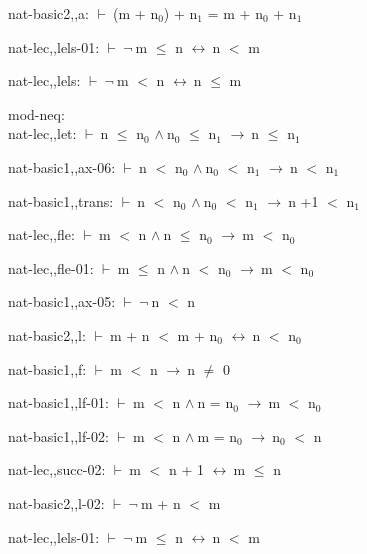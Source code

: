 \documentclass[a4paper]{article}
\newcommand{\Fol}{\mbox{$\vdash\ $}}
\newcommand{\Not}{\mbox{$\neg\ $}}
\newcommand{\And}{\mbox{$\wedge\ $}}
\newcommand{\Imp}{\mbox{$\rightarrow\ $}}
\newcommand{\Equiv}{\mbox{$\leftrightarrow\ $}}
\begin{document}
nat-basic2,,a: 
 \Fol (m + $\mbox{n}_{0}$) + $\mbox{n}_{1}$ = m + $\mbox{n}_{0}$ + $\mbox{n}_{1}$



nat-lec,,lels-01: 
 \Fol \Not m $\le$ n \Equiv n $<$ m



nat-lec,,lels: 
 \Fol \Not m $<$ n \Equiv n $\le$ m



\bigskip

mod-neq:\\ nat-lec,,let: 
 \Fol n $\le$ $\mbox{n}_{0}$ \And $\mbox{n}_{0}$ $\le$ $\mbox{n}_{1}$ \Imp n $\le$ $\mbox{n}_{1}$



nat-basic1,,ax-06: 
 \Fol n $<$ $\mbox{n}_{0}$ \And $\mbox{n}_{0}$ $<$ $\mbox{n}_{1}$ \Imp n $<$ $\mbox{n}_{1}$



nat-basic1,,trans: 
 \Fol n $<$ $\mbox{n}_{0}$ \And $\mbox{n}_{0}$ $<$ $\mbox{n}_{1}$ \Imp n +1 $<$ $\mbox{n}_{1}$



nat-lec,,fle: 
 \Fol m $<$ n \And n $\le$ $\mbox{n}_{0}$ \Imp m $<$ $\mbox{n}_{0}$



nat-lec,,fle-01: 
 \Fol m $\le$ n \And n $<$ $\mbox{n}_{0}$ \Imp m $<$ $\mbox{n}_{0}$



nat-basic1,,ax-05: 
 \Fol \Not n $<$ n



nat-basic2,,l: 
 \Fol m + n $<$ m + $\mbox{n}_{0}$ \Equiv n $<$ $\mbox{n}_{0}$



nat-basic1,,f: 
 \Fol m $<$ n \Imp n $\neq$ 0



nat-basic1,,lf-01: 
 \Fol m $<$ n \And n = $\mbox{n}_{0}$ \Imp m $<$ $\mbox{n}_{0}$



nat-basic1,,lf-02: 
 \Fol m $<$ n \And m = $\mbox{n}_{0}$ \Imp $\mbox{n}_{0}$ $<$ n



nat-lec,,succ-02: 
 \Fol m $<$ n + 1 \Equiv m $\le$ n



nat-basic2,,l-02: 
 \Fol \Not m + n $<$ m



nat-lec,,lels-01: 
 \Fol \Not m $\le$ n \Equiv n $<$ m
\end{document}

